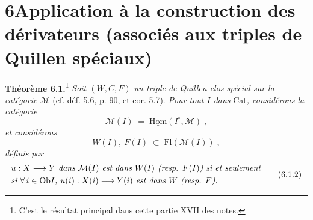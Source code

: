 \documentclass[11pt]{article}
\newcommand{\printedpage}[1]{\marginpar{\footnotesize p.~#1}}
\newcommand{\msp}[1]{\marginpar{\footnotesize [#1]}}
\newcommand{\Ob}{\mathrm{Ob}}
\newcommand{\Fl}{\mathrm{Fl}}
\begin{document}
\printedpage{49}

\msp{page 98}

\section*{6\quad Application à la construction des dérivateurs (associés aux triples de Quillen spéciaux)}

\textbf{Théorème 6.1.}\footnote[29]{C'est le résultat principal dans cette partie XVII des notes.} \textit{Soit $(W,C,F)$ un triple de Quillen clos spécial sur la catégorie $\mathcal{M}$} (cf. déf. 5.6, p. 90, et cor. 5.7). \textit{Pour tout $I$ dans} Cat\textit{, considérons la catégorie}
\[
\mathcal{M}(I) \;=\; \underline{\mathrm{Hom}}(I^{\circ},\mathcal{M}) \;, \tag*{(6.1.1)}
\]
\textit{et considérons}
\[
W(I),\ F(I) \;\subset\; \Fl(\mathcal{M}(I)) \;,
\]
\textit{définis par}
\[
\begin{aligned}
&\text{\textit{$u : X \longrightarrow Y$ dans $\mathcal{M}(I)$ est dans $W(I)$ (resp. $F(I)$) si et seulement}}\\
&\text{\textit{si $\forall\, i \in \Ob I$, $u(i) : X(i) \longrightarrow Y(i)$ est dans $W$ (resp. $F$).}}
\end{aligned}
\tag*{(6.1.2)}
\]
\end{document}
